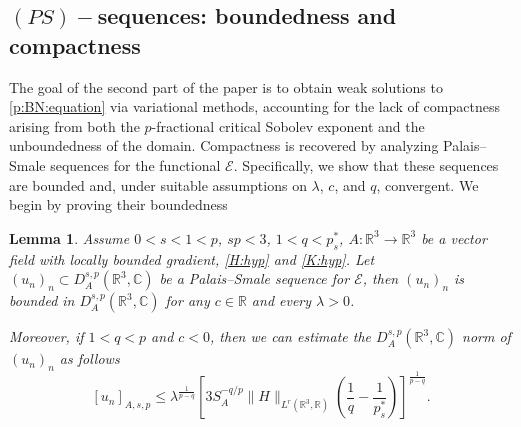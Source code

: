 \documentclass[leqno,11pt]{amsart}
\newcommand{\R}{\mathbb R}
\newcommand{\C}{\mathbb C}
\newcommand{\cE}{{\mathcal E}}
\numberwithin{equation}{section}
\newtheorem{lemma}[theorem]{Lemma}
\begin{document}
 



\subsection{\texorpdfstring{$(PS)-$}{(PS)-}sequences: boundedness and compactness}

The goal of the second part of the paper is to obtain weak solutions to \eqref{p:BN:equation} via variational methods, accounting for the lack of compactness arising from both the $p$-fractional critical Sobolev exponent and the unboundedness of the domain. Compactness is recovered by analyzing Palais–Smale sequences for the functional $\cE$. Specifically, we show that these sequences are bounded and, under suitable assumptions on $\lambda$, $c$, and $q$, convergent. We begin by proving their boundedness

\begin{lemma}\label{lembound} 
Assume $0<s<1<p$, $sp<3$, $1<q<p^*_s$, $A:\R^3 \to \R^3$ be a vector field with locally bounded gradient, \eqref{H:hyp} and \eqref{K:hyp}.
Let $(u_n)_n\subset D^{s,p}_A(\R^3,\C)$ be a Palais--Smale sequence for $\cE$, then 
$(u_n)_n$ is bounded in $D^{s,p}_A(\R^3,\C)$ for any $c\in\R$ and every $\lambda>0$.

Moreover, if $1<q<p$ and $c<0$, then we can estimate the $D^{s,p}_A(\R^3,\C)$ norm of $(u_n)_n$ as follows
\begin{equation}\label{estnorm}
[u_n]_{A,s,p}\le \lambda^{\frac{1}{p-q}}\left[3 S_A^{-q/p}\|H\|_{L^r(\R^3,\R)}\left(\frac{1}{q}-\frac{1}{p^*_s}\right)\right]^{\frac{1}{p-q}}.
\end{equation}
\end{lemma}
\end{document}
